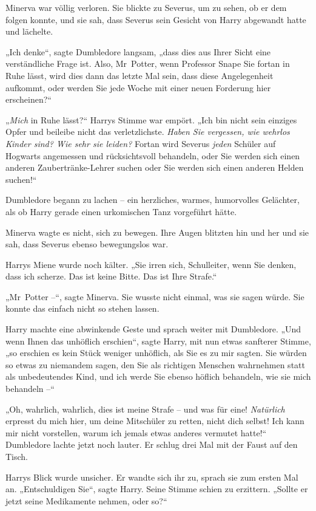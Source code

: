 Minerva war völlig verloren. Sie blickte zu Severus, um zu sehen, ob er dem folgen konnte, und sie sah, dass Severus sein Gesicht von Harry abgewandt hatte und lächelte. 

„Ich denke“, sagte Dumbledore langsam, „dass dies aus Ihrer Sicht eine verständliche Frage ist. Also, Mr~Potter, wenn Professor Snape Sie fortan in Ruhe lässt, wird dies dann das letzte Mal sein, dass diese Angelegenheit aufkommt, oder werden Sie jede Woche mit einer neuen Forderung hier erscheinen?“ 

„\emph{Mich} in Ruhe lässt?“ Harrys Stimme war empört. „Ich bin nicht sein einziges Opfer und beileibe nicht das verletzlichste. \emph{Haben Sie vergessen, wie wehrlos Kinder sind? Wie sehr sie leiden?} Fortan wird Severus \emph{jeden} Schüler auf Hogwarts angemessen und rücksichtsvoll behandeln, oder Sie werden sich einen anderen Zaubertränke-Lehrer suchen oder Sie werden sich einen anderen Helden suchen!“ 

Dumbledore begann zu lachen – ein herzliches, warmes, humorvolles Gelächter, als ob Harry gerade einen urkomischen Tanz vorgeführt hätte. 

Minerva wagte es nicht, sich zu bewegen. Ihre Augen blitzten hin und her und sie sah, dass Severus ebenso bewegungslos war. 

Harrys Miene wurde noch kälter. „Sie irren sich, Schulleiter, wenn Sie denken, dass ich scherze. Das ist keine Bitte. Das ist Ihre Strafe.“ 

„Mr~Potter –“, sagte Minerva. Sie wusste nicht einmal, was sie sagen würde. Sie konnte das einfach nicht so stehen lassen. 

Harry machte eine abwinkende Geste und sprach weiter mit Dumbledore. „Und wenn Ihnen das unhöflich erschien“, sagte Harry, mit nun etwas sanfterer Stimme, „so erschien es kein Stück weniger unhöflich, als Sie es zu mir sagten. Sie würden so etwas zu niemandem sagen, den Sie als richtigen Menschen wahrnehmen statt als unbedeutendes Kind, und ich werde Sie ebenso höflich behandeln, wie sie mich behandeln –“ 

„Oh, wahrlich, wahrlich, dies ist meine Strafe – und was für eine! \emph{Natürlich} erpresst du mich hier, um deine Mitschüler zu retten, nicht dich selbst! Ich kann mir nicht vorstellen, warum ich jemals etwas anderes vermutet hatte!“ Dumbledore lachte jetzt noch lauter. Er schlug drei Mal mit der Faust auf den Tisch. 

Harrys Blick wurde unsicher. Er wandte sich ihr zu, sprach sie zum ersten Mal an. „Entschuldigen Sie“, sagte Harry. Seine Stimme schien zu erzittern. „Sollte er jetzt seine Medikamente nehmen, oder so?“ 

